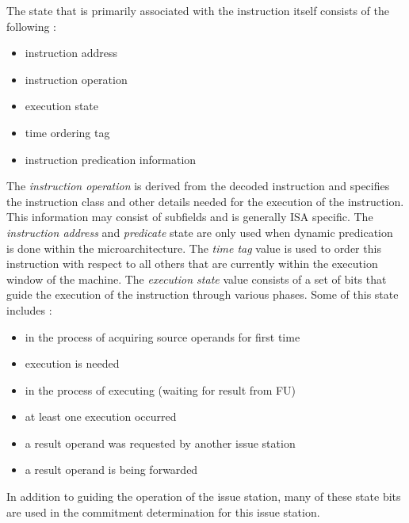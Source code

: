 \documentclass[10pt,dvips]{article}
\begin{document}
The state that is primarily associated with the instruction itself
consists of the following :
%
\begin{itemize}
\vspace{-0.10in}
\item{instruction address}
\vspace{-0.10in}
\item{instruction operation}
\vspace{-0.10in}
\item{execution state}
\vspace{-0.10in}
\item{time ordering tag}
\vspace{-0.10in}
\item{instruction predication information}
\vspace{-0.10in}
\end{itemize}   
%
The \textit{instruction operation} is derived from the decoded
instruction and specifies the instruction class and other
details needed for the execution of the instruction.
This information may consist of subfields and is generally ISA
specific.
The \textit{instruction address} and \textit{predicate} state
are only used when dynamic predication~\cite{undisclosed2}
is done within the microarchitecture.
The \textit{time tag} value is used to order this instruction
with respect to all others that are currently within the execution
window of the machine.
The \textit{execution state} value consists of a set of
bits that guide the execution of the instruction through
various phases.  Some of this state includes :
%
\begin{itemize}
\vspace{-0.10in}
\item{in the process of acquiring source operands for first time}
\vspace{-0.10in}
\item{execution is needed}
\vspace{-0.10in}
\item{in the process of executing (waiting for result from FU)}
\vspace{-0.10in}
\item{at least one execution occurred}
\vspace{-0.10in}
\item{a result operand was requested by another issue station}
\vspace{-0.10in}
\item{a result operand is being forwarded}
\vspace{-0.10in}
\end{itemize}   
%
In addition to guiding the operation of the issue station,
many of these state bits are used in the commitment determination
for this issue station.
\end{document}
